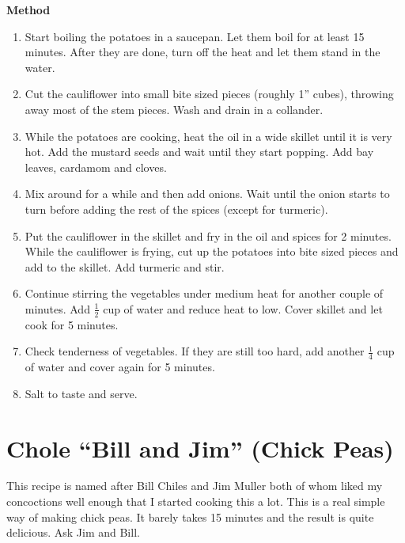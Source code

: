 {\bf Method}
\begin{enumerate}
\item  Start boiling the potatoes in a saucepan.   Let  them  boil  for  at
      least  15  minutes.   After they are done, turn off the heat and let
      them stand in the water.
\item Cut the cauliflower into small bite  sized  pieces  (roughly  1''
      cubes),  throwing  away  most of the stem pieces.  Wash and drain in a
      collander.
\item While the potatoes are cooking, heat the oil in a wide skillet  until
      it  is  very  hot.    Add the mustard seeds and wait until they start
      popping.  Add bay leaves, cardamom and cloves.
\item Mix around for a while and then add onions.  Wait until the onion  starts
      to turn before adding the rest of the spices (except for turmeric).
   \item Put the cauliflower in the skillet and  fry in the oil and spices
      for 2 minutes.  While the cauliflower is frying, cut up the potatoes
      into  bite  sized  pieces  and  add to the skillet.  Add turmeric and
      stir.
   \item Continue stirring the  vegetables  under  medium  heat  for  another
      couple  of minutes.  Add $\frac{1}{2}$ cup of water and reduce heat to low.
      Cover skillet and let cook for 5 minutes.
   \item Check tenderness of vegetables.  If they are  still  too  hard,  add
      another $\frac{1}{4}$ cup of water and cover again for 5 minutes.
   \item Salt to taste and serve.

\end{enumerate}

\section{Chole ``Bill and Jim'' (Chick Peas)}
  This  recipe  is  named after Bill Chiles and Jim Muller both of whom liked my
concoctions well enough that I started cooking this a lot.    This  is  a  real
simple  way of making chick peas.  It barely takes 15 minutes and the result is
quite delicious.  Ask Jim and Bill.

